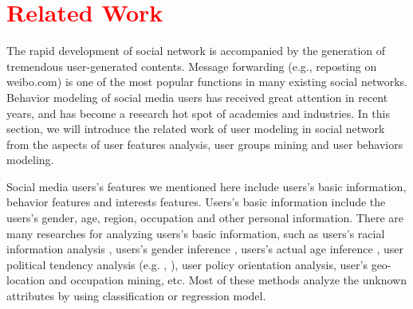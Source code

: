 \section{\textcolor{red}{Related Work}}
\label{sec:rela}

The rapid development of social network is accompanied by the generation of tremendous user-generated contents. Message forwarding (e.g., reposting on weibo.com) is one of the most popular functions in many existing social networks. Behavior modeling of social media users has received great attention in recent years, and has become a research hot spot of academies and industries. In this section, we will introduce the related work of user modeling in social network from the aspects of user features analysis, user groups mining and user behaviors modeling.\par

Social media users's features we mentioned here include users's basic information, behavior features and interests features. Users's basic information include the users's gender, age, region, occupation and other personal information. There are many researches for analyzing users's basic information, such as users's racial information analysis \cite{IEEEexample:conf/icwsm/PennacchiottiP11}, users's gender inference \cite{IEEEexample:conf/emnlp/CiotSR13}, users's actual age inference \cite{IEEEexample:conf/icde/ParkHHL09}, user political tendency analysis (e.g. \cite{IEEEexample:conf/icwsm/PennacchiottiP11}, \cite{IEEEexample:conf/acl/VolkovaCD14}), user policy orientation analysis\cite{IEEEexample:kosinski2013private}, user's geo-location and occupation mining\cite{IEEEexample:journals/tmm/FangSXH15,IEEEexample:conf/icde/FanCTWC16}, etc. Most of these methods analyze the unknown attributes by using classification or regression model.\par

